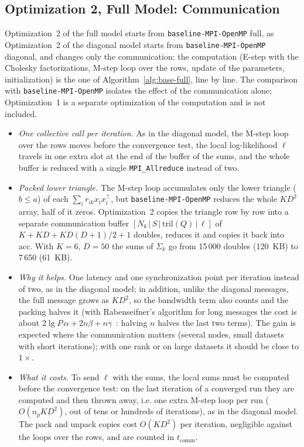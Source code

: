 \documentclass[conference,onecolumn]{IEEEtran}
\newcommand{\vbase}{\texttt{baseline-\allowbreak MPI-\allowbreak OpenMP}}
\begin{document}
\subsection{Optimization 2, Full Model: Communication}
Optimization~2 of the full model starts from \vbase{} full, as Optimization~2 of the diagonal model starts from \vbase{} diagonal, and changes only the communication: the computation (E-step with the Cholesky factorizations, M-step loop over the rows, update of the parameters, initialization) is the one of Algorithm~\ref{alg:base-full}, line by line. The comparison with \vbase{} isolates the effect of the communication alone; Optimization~1 is a separate optimization of the computation and is not included.
\begin{itemize}
\item \emph{One collective call per iteration.} As in the diagonal model, the M-step loop over the rows moves before the convergence test, the local log-likelihood $\ell$ travels in one extra slot at the end of the buffer of the sums, and the whole buffer is reduced with a single \texttt{MPI\_Allreduce} instead of two.
\item \emph{Packed lower triangle.} The M-step loop accumulates only the lower triangle ($b\le a$) of each $\sum_i r_{ik}x_ix_i^\top$, but \vbase{} reduces the whole $KD^2$ array, half of it zeros. Optimization~2 copies the triangle row by row into a separate communication buffer $[N_k\,|\,S\,|\,\mathrm{tril}(Q)\,|\,\ell]$ of $K+KD+KD(D+1)/2+1$ doubles, reduces it and copies it back into acc. With $K=6$, $D=50$ the sums of $\Sigma_k$ go from 15\,000 doubles (120~KB) to 7\,650 (61~KB).
\item \emph{Why it helps.} One latency and one synchronization point per iteration instead of two, as in the diagonal model; in addition, unlike the diagonal messages, the full message grows as $KD^2$, so the bandwidth term also counts and the packing halves it (with Rabenseifner's algorithm for long messages the cost is about $2\lg P\,\alpha+2n\beta+n\gamma$~\cite{thakur}: halving $n$ halves the last two terms). The gain is expected where the communication matters (several nodes, small datasets with short iterations); with one rank or on large datasets it should be close to $1\times$.
\item \emph{What it costs.} To send $\ell$ with the sums, the local sums must be computed before the convergence test: on the last iteration of a converged run they are computed and then thrown away, i.e. one extra M-step loop per run ($O(n_pKD^2)$, out of tens or hundreds of iterations), as in the diagonal model. The pack and unpack copies cost $O(KD^2)$ per iteration, negligible against the loops over the rows, and are counted in $t_{\mathrm{comm}}$.

\end{itemize}
\end{document}

